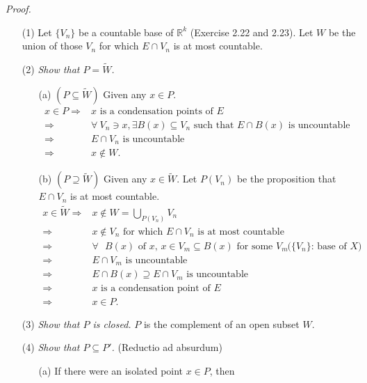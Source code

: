 \documentclass{article}
\begin{document}
\emph{Proof.}
\begin{enumerate}
\item[(1)]
Let $\{V_n\}$ be a countable base of $\mathbb{R}^k$ (Exercise 2.22 and 2.23).
Let $W$ be the union of those $V_n$ for which $E \cap V_n$ is at most countable.
\item[(2)]
\emph{Show that $P = \widetilde{W}$.}
  \begin{enumerate}
  \item[(a)]
  $(P \subseteq \widetilde{W})$
  Given any $x \in P$.
  \begin{align*}
  x \in P
  \Longrightarrow&
  \text{$x$ is a condensation points of $E$} \\
  \Longrightarrow&
  \text{$\forall \: V_n \ni x, \exists B(x) \subseteq V_n$ such that
    $E \cap B(x)$ is uncountable} \\
  \Longrightarrow&
  \text{$E \cap V_n$ is uncountable} \\
  \Longrightarrow&
  x \not\in W.
  \end{align*}
  \item[(b)]
  $(P \supseteq \widetilde{W})$
  Given any $x \in \widetilde{W}$.
  Let $P(V_n)$ be the proposition that $E \cap V_n$ is at most countable.
  \begin{align*}
  x \in \widetilde{W}
  \Longrightarrow&
  x \not\in W = \bigcup_{P(V_n)} V_n \\
  \Longrightarrow&
  \text{$x \not\in V_n$ for which $E \cap V_n$ is at most countable} \\
  \Longrightarrow&
  \text{$\forall$ $B(x)$ of $x$, $x \in V_m \subseteq B(x)$ for some $V_m$}
    &\text{($\{V_n\}$: base of $X$)} \\
  \Longrightarrow&
  \text{$E \cap V_m$ is uncountable} \\
  \Longrightarrow&
  \text{$E \cap B(x) \supseteq E \cap V_m$ is uncountable} \\
  \Longrightarrow&
  \text{$x$ is a condensation point of $E$} \\
  \Longrightarrow&
  x \in P.
  \end{align*}
  \end{enumerate}
\item[(3)]
\emph{Show that $P$ is closed.}
$P$ is the complement of an open subset $W$.
\item[(4)]
\emph{Show that $P \subseteq P'$.}
(Reductio ad absurdum)
  \begin{enumerate}
  \item[(a)]
  If there were an isolated point $x \in P$, then

\end{enumerate}
\end{enumerate}
\end{document}
